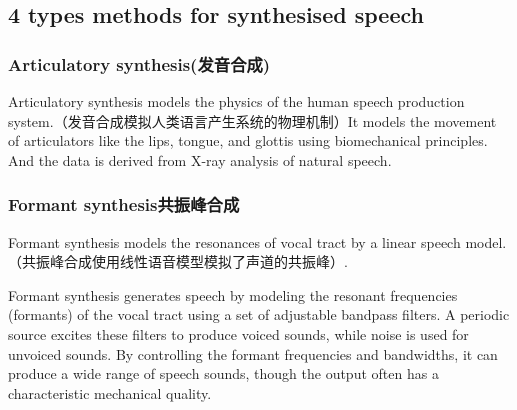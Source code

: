 \documentclass[UTF8]{ctexart}
\begin{document}
\subsection{4 types methods for synthesised speech}
\subsubsection{Articulatory synthesis(发音合成)}

Articulatory synthesis models the physics of the human speech production system.（发音合成模拟人类语言产生系统的物理机制）It models the movement of articulators like the lips, tongue, and glottis using biomechanical principles. And the data is derived from X-ray analysis of natural speech.

\subsubsection{Formant synthesis共振峰合成}

Formant synthesis models the resonances of vocal tract by a linear speech model.（共振峰合成使用线性语音模型模拟了声道的共振峰）.

Formant synthesis generates speech by modeling the resonant frequencies (formants) of the vocal tract using a set of adjustable bandpass filters. A periodic source excites these filters to produce voiced sounds, while noise is used for unvoiced sounds. By controlling the formant frequencies and bandwidths, it can produce a wide range of speech sounds, though the output often has a characteristic mechanical quality.
\end{document}
